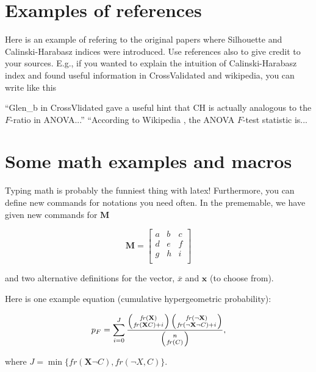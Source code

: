 \documentclass[a4paper,12pt]{article}
\newcommand{\Mmatr}{\ensuremath{\mathbf{M}}}
\newcommand{\xvec}{\ensuremath{\overline{x}}}
\newcommand{\xvecII}{\ensuremath{\mathbf{x}}} %
\newcommand{\Xset}{\ensuremath{\mathbf{X}}}
\newcommand{\fr}{\ensuremath{\mathit{fr}}} %
\begin{document}
\section{Examples of references}

Here is an example of refering to
the original papers where Silhouette \cite{SI} and Calinski-Harabasz \cite{CH} indices were introduced.
Use references also to give credit to your sources. E.g., if you
wanted to explain the intuition of Calinski-Harabasz index
and found useful information in CrossValidated and wikipedia, you can
write like this

``Glen\_b in CrossVlidated \cite{glennCV} gave a useful hint that CH
is actually analogous to the $F$-ratio in ANOVA...'' ``According to Wikipedia \cite{Fwiki}, the ANOVA $F$-test statistic is...


\section{Some math examples and macros}

Typing math is probably the funniest thing with latex! Furthermore,
you can define new commands for notations you need often. In the
prememable, we have given new commands for $\Mmatr$

$$\Mmatr=\left[
    \begin{array}{ccc}
      a & b & c \\
      d & e & f \\
      g & h & i \\
    \end{array}\right]$$

and two alternative definitions for the vector, $\xvec$ and $\xvecII$ (to choose from).

Here is one example equation (cumulative hypergeometric probability):

$$p_F=\sum_{i=0}^J\frac{\left(\fr(\Xset) \atop \fr(\Xset C)+i
    \right) \left(\fr(\neg \Xset) \atop \fr(\neg \Xset \neg C)+i \right)}{\left(
    n
    \atop \fr(C)\right)},$$

where $J=\min\{\fr(\Xset\neg C),\fr(\neg X,C)\}$.

% 

% 
\end{document}
